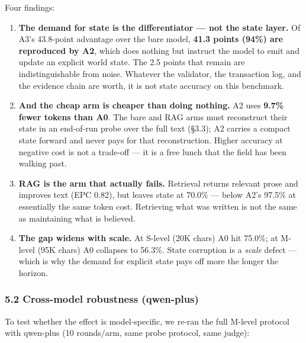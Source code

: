 \documentclass[
  english,
]{article}
\providecommand{\tightlist}{%
  \setlength{\itemsep}{0pt}\setlength{\parskip}{0pt}}
\begin{document}
Four findings:

\begin{enumerate}
\def\labelenumi{\arabic{enumi}.}
\tightlist
\item
  \textbf{The demand for state is the differentiator --- not the state
  layer.} Of A3's 43.8-point advantage over the bare model, \textbf{41.3
  points (94\%) are reproduced by A2}, which does nothing but instruct
  the model to emit and update an explicit world state. The 2.5 points
  that remain are indistinguishable from noise. Whatever the validator,
  the transaction log, and the evidence chain are worth, it is not state
  accuracy on this benchmark.
\item
  \textbf{And the cheap arm is cheaper than doing nothing.} A2 uses
  \textbf{9.7\% fewer tokens than A0}. The bare and RAG arms must
  reconstruct their state in an end-of-run probe over the full text
  (§3.3); A2 carries a compact state forward and never pays for that
  reconstruction. Higher accuracy at negative cost is not a trade-off
  --- it is a free lunch that the field has been walking past.
\item
  \textbf{RAG is the arm that actually fails.} Retrieval returns
  relevant prose and improves text (EPC 0.82), but leaves state at
  70.0\% --- below A2's 97.5\% at essentially the same token cost.
  Retrieving what was written is not the same as maintaining what is
  believed.
\item
  \textbf{The gap widens with scale.} At S-level (20K chars) A0 hit
  75.0\%; at M-level (95K chars) A0 collapses to 56.3\%. State
  corruption is a \emph{scale} defect --- which is why the demand for
  explicit state pays off more the longer the horizon.
\end{enumerate}

\subsubsection{5.2 Cross-model robustness
(qwen-plus)}\label{cross-model-robustness-qwen-plus}

To test whether the effect is model-specific, we re-ran the full M-level
protocol with qwen-plus (10 rounds/arm, same probe protocol, same
judge):
\end{document}
